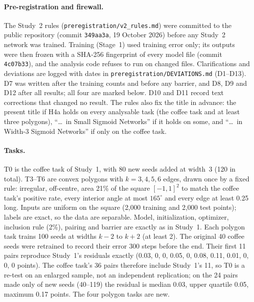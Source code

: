 \documentclass[11pt]{article}
\begin{document}
\paragraph{Pre-registration and firewall.} The Study~2 rules (\texttt{preregistration/v2\_rules.md}) were committed to the public repository (commit \texttt{349aa3a}, 19 October 2026) before any Study~2 network was trained. Training (Stage~1) used training error only; its outputs were then frozen with a SHA-256 fingerprint of every model file (commit \texttt{4c07b33}), and the analysis code refuses to run on changed files. Clarifications and deviations are logged with dates in \texttt{preregistration/DEVIATIONS.md} (D1--D13). D7 was written after the training counts and before any barrier, and D8, D9 and D12 after all results; all four are marked below. D10 and D11 record text corrections that changed no result. The rules also fix the title in advance: the present title if H4a holds on every analysable task (the coffee task and at least three polygons), ``\dots\ in Small Sigmoid Networks'' if it holds on some, and ``\dots\ in Width-3 Sigmoid Networks'' if only on the coffee task.

\paragraph{Tasks.} T0 is the coffee task of Study~1, with 80 new seeds added at width~3 (120 in total). T3--T6 are convex polygons with $k = 3, 4, 5, 6$ edges, drawn once by a fixed rule: irregular, off-centre, area 21\% of the square $[-1,1]^2$ to match the coffee task's positive rate, every interior angle at most $165^\circ$ and every edge at least 0.25 long. Inputs are uniform on the square (2{,}000 training and 2{,}000 test points); labels are exact, so the data are separable. Model, initialization, optimizer, inclusion rule (2\%), pairing and barrier are exactly as in Study~1. Each polygon task trains 100 seeds at widths $k-2$ to $k+2$ (at least 2). The original 40 coffee seeds were retrained to record their error 300 steps before the end. Their first 11 pairs reproduce Study~1's residuals exactly (0.03, 0, 0, 0.05, 0, 0.08, 0.11, 0.01, 0, 0, 0 points). The coffee task's 36 pairs therefore include Study~1's 11, so T0 is a re-test on an enlarged sample, not an independent replication; on the 24 pairs made only of new seeds (40--119) the residual is median 0.03, upper quartile 0.05, maximum 0.17 points. The four polygon tasks are new.
\end{document}
